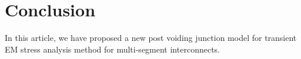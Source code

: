 \documentclass[conference]{IEEEtran}
\begin{document}






\section{Conclusion}
\label{sec:conclusion}
In this article, we have proposed a new post voiding junction model for
transient EM stress analysis method for multi-segment
interconnects.




\end{document}
